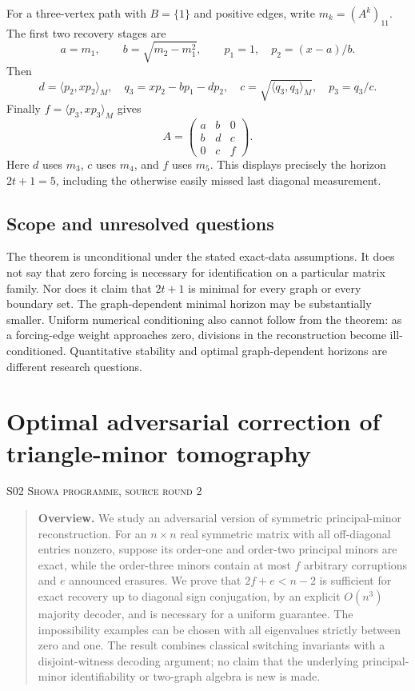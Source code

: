 \documentclass[11pt,a4paper]{article}
\theoremstyle{definition}\newtheorem{definition}[theorem]{Definition}
\theoremstyle{remark}\newtheorem{remark}[theorem]{Remark}
\numberwithin{equation}{section}
\begin{document}
For a three-vertex path with $B=\{1\}$ and positive edges, write $m_k=(A^k)_{11}$. The first two recovery stages are
\[
 a=m_1,\qquad b=\sqrt{m_2-m_1^2},\qquad
 p_1=1,\quad p_2=(x-a)/b.
\]
Then
\[
 d=\langle p_2,xp_2\rangle_M,
 \quad q_3=xp_2-bp_1-dp_2,
 \quad c=\sqrt{\langle q_3,q_3\rangle_M},
 \quad p_3=q_3/c.
\]
Finally $f=\langle p_3,xp_3\rangle_M$ gives
\[
 A=\begin{pmatrix}a&b&0\\b&d&c\\0&c&f\end{pmatrix}.
\]
Here $d$ uses $m_3$, $c$ uses $m_4$, and $f$ uses $m_5$. This displays precisely the horizon $2t+1=5$, including the otherwise easily missed last diagonal measurement.

\subsection{Scope and unresolved questions}\label{S01-sec-5}
The theorem is unconditional under the stated exact-data assumptions. It does not say that zero forcing is necessary for identification on a particular matrix family. Nor does it claim that $2t+1$ is minimal for every graph or every boundary set. The graph-dependent minimal horizon may be substantially smaller. Uniform numerical conditioning also cannot follow from the theorem: as a forcing-edge weight approaches zero, divisions in the reconstruction become ill-conditioned. Quantitative stability and optimal graph-dependent horizons are different research questions.





\clearpage
\section[S02 --- Optimal adversarial correction of triangle-minor tomography]{Optimal adversarial correction of triangle-minor tomography}\label{contrib-S02}
\noindent\textsc{S02 \quad Showa programme, source round 2}\par\medskip



\begin{quote}\small\textbf{Overview.} We study an adversarial version of symmetric principal-minor reconstruction. For an $n\times n$ real symmetric matrix with all off-diagonal entries nonzero, suppose its order-one and order-two principal minors are exact, while the order-three minors contain at most $f$ arbitrary corruptions and $e$ announced erasures. We prove that $2f+e<n-2$ is sufficient for exact recovery up to diagonal sign conjugation, by an explicit $O(n^3)$ majority decoder, and is necessary for a uniform guarantee. The impossibility examples can be chosen with all eigenvalues strictly between zero and one. The result combines classical switching invariants with a disjoint-witness decoding argument; no claim that the underlying principal-minor identifiability or two-graph algebra is new is made.\end{quote}
\end{document}

